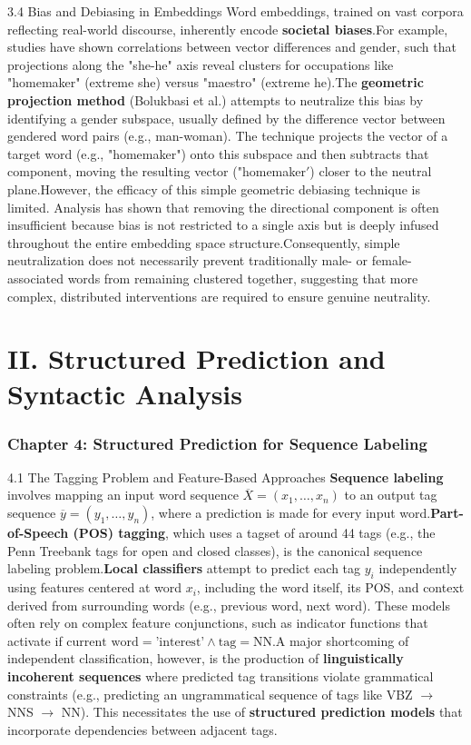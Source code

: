 \documentclass{article}
\begin{document}
3.4 Bias and Debiasing in Embeddings
Word embeddings, trained on vast corpora reflecting real-world discourse, inherently encode \textbf{societal biases}.\footnotemark[1] For example, studies have shown correlations between vector differences and gender, such that projections along the "she-he" axis reveal clusters for occupations like "homemaker" (extreme she) versus "maestro" (extreme he).\footnotemark[1]
The \textbf{geometric projection method} (Bolukbasi et al.) attempts to neutralize this bias by identifying a gender subspace, usually defined by the difference vector between gendered word pairs (e.g., man-woman). The technique projects the vector of a target word (e.g., "homemaker") onto this subspace and then subtracts that component, moving the resulting vector ("homemaker$'$) closer to the neutral plane.\footnotemark[1]
However, the efficacy of this simple geometric debiasing technique is limited. Analysis has shown that removing the directional component is often insufficient because bias is not restricted to a single axis but is deeply infused throughout the entire embedding space structure.\footnotemark[1] Consequently, simple neutralization does not necessarily prevent traditionally male- or female-associated words from remaining clustered together, suggesting that more complex, distributed interventions are required to ensure genuine neutrality.\footnotemark[1]

\part{II. Structured Prediction and Syntactic Analysis}
\section{Chapter 4: Structured Prediction for Sequence Labeling}
4.1 The Tagging Problem and Feature-Based Approaches
\textbf{Sequence labeling} involves mapping an input word sequence $\overline{X}=(x_1, \ldots, x_n)$ to an output tag sequence $\overline{y}=(y_1, \ldots, y_n)$, where a prediction is made for every input word.\footnotemark[1] \textbf{Part-of-Speech (POS) tagging}, which uses a tagset of around 44 tags (e.g., the Penn Treebank tags for open and closed classes), is the canonical sequence labeling problem.\footnotemark[1]
\textbf{Local classifiers} attempt to predict each tag $y_i$ independently using features centered at word $x_i$, including the word itself, its POS, and context derived from surrounding words (e.g., previous word, next word). These models often rely on complex feature conjunctions, such as indicator functions that activate if $\text{current word} = \text{'interest'} \wedge \text{tag} = \text{NN}$.\footnotemark[1]
A major shortcoming of independent classification, however, is the production of \textbf{linguistically incoherent sequences} where predicted tag transitions violate grammatical constraints (e.g., predicting an ungrammatical sequence of tags like VBZ $\rightarrow$ NNS $\rightarrow$ NN). This necessitates the use of \textbf{structured prediction models} that incorporate dependencies between adjacent tags.\footnotemark[1]
\end{document}
